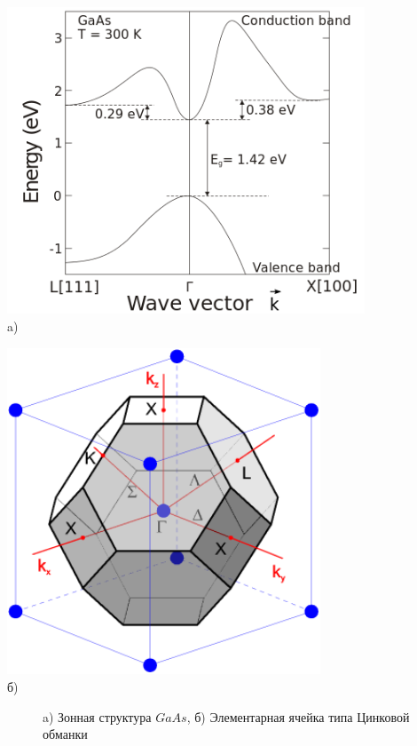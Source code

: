 \noindent
\begin{minipage}[b]{0.5\textwidth}
	\centering
    \includegraphics[width=0.8\textwidth]{assets/GaAs_E}\\
    a)
\end{minipage}
\hfill
\begin{minipage}[b]{0.45\textwidth}
	\centering
	\includegraphics[width=0.7\textwidth]{assets/ZnLaer}\\
	б)
\end{minipage}
\begin{figure}[h!]
	\centering
	\caption{a) Зонная структура $GaAs$, б) Элементарная ячейка типа Цинковой обманки}
\end{figure}

